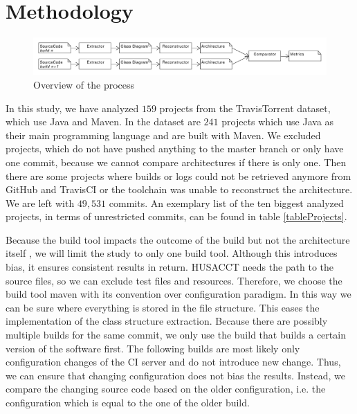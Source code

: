 \documentclass[sigplan, anonymous, review]{acmart}
\begin{document}
\section{Methodology}

\begin{figure}[!t]
	\centering
	\includegraphics[width=7in]{assets/overview.pdf}
	\caption{Overview of the process}
	\label{overview}
\end{figure}



In this study, we have analyzed $159$ projects from the TravisTorrent dataset, which use Java and Maven. In the dataset are $241$ projects which use Java as their main programming language and are built with Maven. We excluded projects, which do not have pushed anything to the master branch or only have one commit, because we cannot compare architectures if there is only one. Then there are some projects where builds or logs could not be retrieved anymore from GitHub and TravisCI or the toolchain was unable to reconstruct the architecture. We are left with $49,531$ commits. An exemplary list of the ten biggest analyzed projects, in terms of unrestricted commits, can be found in table \ref{tableProjects}.

Because the build tool impacts the outcome of the build but not the architecture itself \cite{FailsCorr}, we will limit the study to only one build tool. Although this introduces bias, it ensures consistent results in return. HUSACCT needs the path to the source files, so we can exclude test files and resources. Therefore, we choose the build tool maven with its convention over configuration paradigm. In this way we can be sure where everything is stored in the file structure. This eases the implementation of the class structure extraction. 
Because there are possibly multiple builds for the same commit, we only use the build that builds a certain version of the software first. The following builds are most likely only configuration changes of the CI server and do not introduce new change. Thus, we can ensure that changing configuration does not bias the results. Instead, we compare the changing source code based on the older configuration, i.e. the configuration which is equal to the one of the older build. 
\end{document}
